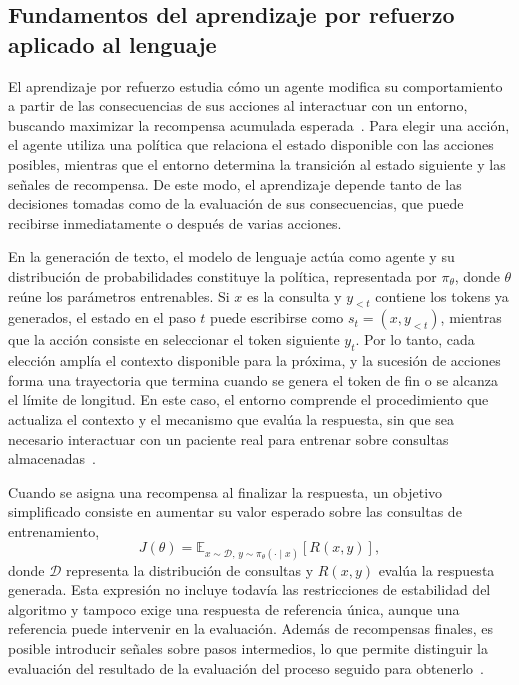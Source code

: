 \subsection{Fundamentos del aprendizaje por refuerzo aplicado al lenguaje}
\label{sec:rl-lenguaje}
El aprendizaje por refuerzo estudia cómo un agente modifica su comportamiento a partir de las consecuencias de sus acciones al interactuar con un entorno, buscando maximizar la recompensa acumulada esperada~\cite{sutton2018reinforcement}. Para elegir una acción, el agente utiliza una política que relaciona el estado disponible con las acciones posibles, mientras que el entorno determina la transición al estado siguiente y las señales de recompensa. De este modo, el aprendizaje depende tanto de las decisiones tomadas como de la evaluación de sus consecuencias, que puede recibirse inmediatamente o después de varias acciones.

En la generación de texto, el modelo de lenguaje actúa como agente y su distribución de probabilidades constituye la política, representada por $\pi_\theta$, donde $\theta$ reúne los parámetros entrenables. Si $x$ es la consulta y $y_{<t}$ contiene los tokens ya generados, el estado en el paso $t$ puede escribirse como $s_t=(x,y_{<t})$, mientras que la acción consiste en seleccionar el token siguiente $y_t$. Por lo tanto, cada elección amplía el contexto disponible para la próxima, y la sucesión de acciones forma una trayectoria que termina cuando se genera el token de fin o se alcanza el límite de longitud. En este caso, el entorno comprende el procedimiento que actualiza el contexto y el mecanismo que evalúa la respuesta, sin que sea necesario interactuar con un paciente real para entrenar sobre consultas almacenadas~\cite{ouyang2022instructgpt}.

Cuando se asigna una recompensa al finalizar la respuesta, un objetivo simplificado consiste en aumentar su valor esperado sobre las consultas de entrenamiento,
\begin{equation}
J(\theta)=\mathbb{E}_{x\sim\mathcal{D},\,y\sim\pi_\theta(\cdot\mid x)}[R(x,y)],
\label{eq:objetivo-rl}
\end{equation}
donde $\mathcal{D}$ representa la distribución de consultas y $R(x,y)$ evalúa la respuesta generada. Esta expresión no incluye todavía las restricciones de estabilidad del algoritmo y tampoco exige una respuesta de referencia única, aunque una referencia puede intervenir en la evaluación. Además de recompensas finales, es posible introducir señales sobre pasos intermedios, lo que permite distinguir la evaluación del resultado de la evaluación del proceso seguido para obtenerlo~\cite{lightman2023verify}.

